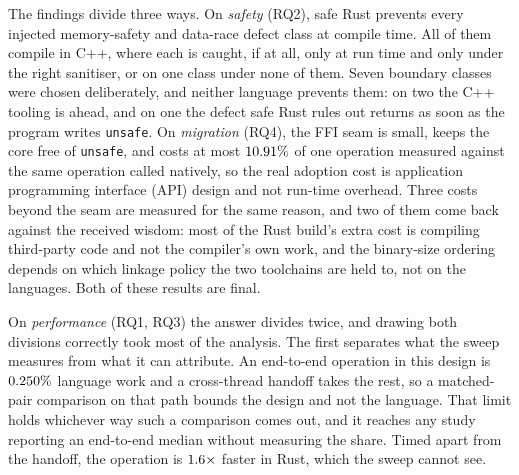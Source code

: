 \documentclass[english,oneside,a4paper,censored,csm,software-track-2020]{HYthesisML}
\begin{document}
The findings divide three ways. On \emph{safety} (RQ2), safe Rust prevents every injected
memory-safety and data-race defect class at compile time. All of them compile in C++, where each
is caught, if at all, only at run time and only under the right sanitiser, or on one class under
none of them. Seven boundary classes were chosen deliberately, and neither language prevents
them: on two the C++ tooling is ahead, and on one the defect safe Rust rules out returns as soon
as the program writes \texttt{unsafe}. On \emph{migration} (RQ4), the FFI seam is small, keeps
the core free of \texttt{unsafe}, and costs at most $10.91\%$ of one operation measured
against the same operation called natively, so the real adoption cost is application programming
interface (API) design and not run-time overhead. Three costs beyond the seam are measured for
the same reason, and two of them come back against the received wisdom: most of the Rust build's
extra cost is compiling third-party code and not the compiler's own work, and the
binary-size ordering depends on which linkage policy the two toolchains are held to, not on the
languages. Both of these results are final.

On \emph{performance} (RQ1, RQ3) the answer divides twice, and drawing both divisions correctly
took most of the analysis. The first separates what the sweep measures from what it can
attribute. An end-to-end operation in this design is $0.250\%$ language work and a
cross-thread handoff takes the rest, so a matched-pair comparison on that path bounds the design
and not the language. That limit holds whichever way such a comparison comes out, and it reaches
any study reporting an end-to-end median without measuring the share. Timed apart from the
handoff, the operation is $1.6\times$ faster in Rust, which the sweep cannot see.
\end{document}
